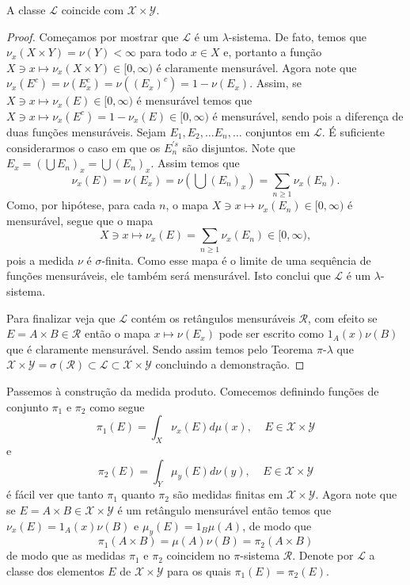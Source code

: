 \begin{proposicao}\label{Mens. Prod}
A classe $\mathscr{L}$ coincide com $\mathscr{X}\times \mathscr{Y}$.
\end{proposicao}
\begin{proof}
Começamos por mostrar que $\mathscr{L}$ é um $\lambda$-sistema. De fato, temos que
$\nu_x(X\times Y)=\nu(Y) < \infty$ para todo $x\in X$ e, portanto
 a função $X\ni x\mapsto \nu_x(X\times Y)\in [0,\infty)$ é claramente mensurável.
  Agora note que $\nu_x(E^c)=\nu(E^c_x)=\nu((E_x)^c)=1-\nu(E_x).$
 Assim, se $X\ni x\mapsto \nu_x(E)\in [0, \infty)$  é mensurável temos que 
 $X\ni x\mapsto \nu_x(E^c)=1-\nu_x(E)\in [0, \infty)$ é mensurável, sendo pois 
 a diferença de duas funções mensuráveis.
  Sejam $E_1, E_2, \ldots E_n, \ldots$ conjuntos em $\mathscr{L}.$ É suficiente 
  considerarmos o caso em que os $E_n^{'s}$ são disjuntos.
  Note que $E_x=(\bigcup E_n)_x=\bigcup (E_n)_x$. Assim temos que 
  $$
  \nu_x(E)=\nu(E_x)=\nu(\bigcup (E_n)_x)=\sum_{n\geq 1}\nu_x(E_n).
  $$
  Como, por hipótese, para cada $n$, o mapa $X\ni x\mapsto \nu_x(E_n)\in [0,\infty)$ é mensurável, segue que 
  o mapa 
  $$
 X\ni x\mapsto \nu_x(E)=\sum_{n\geq 1}\nu_x(E_n)\in [0,\infty),
 $$ 
 pois a medida $\nu$ é $\sigma$-finita. Como esse mapa é o 
limite de uma sequência de funções mensuráveis, ele também será mensurável. Isto conclui que $\mathscr{L}$ é um $\lambda$-sistema.
 
 Para finalizar veja  que $\mathscr{L}$ contém os retângulos mensuráveis $\mathscr{R}$, com efeito se $E=A\times B\in \mathscr{R}$ então o mapa $x\mapsto \nu(E_x)$ pode ser escrito como $1_A(x)\nu(B)$ que é claramente mensurável. Sendo assim temos pelo Teorema $\pi$-$\lambda$ que $\mathscr{X}\times \mathscr{Y}= \sigma(\mathscr{R})\subset \mathscr{L}\subset \mathscr{X}\times \mathscr{Y}$ concluindo a demonstração.
\end{proof}
\medskip


Passemos à construção da medida produto. Comecemos definindo funções de conjunto $\pi_1$ e $\pi_2$ como segue
\begin{equation}\label{M.Prod. 1}
\pi_1(E)=\int_X \nu_x(E) d\mu(x),~~~~~E \in \mathscr{X}\times \mathscr{Y}
\end{equation}
e 
\begin{equation}\label{M. Prod. 2}
\pi_2(E)=\int_Y \mu_y(E)d\nu(y),~~~~~E \in \mathscr{X}\times \mathscr{Y}
\end{equation}
é fácil ver que tanto $\pi_1$ quanto $\pi_2$ são medidas finitas em $\mathscr{X}\times \mathscr{Y}$. Agora note que se $E=A\times B\in\mathscr{X}\times \mathscr{Y}$  é um retângulo mensurável então temos que  $\nu_x(E)=1_A(x)\nu(B)$ e $\mu_y(E)=1_B\mu(A)$, de modo que 
\begin{equation}
\pi_1(A\times B)=\mu(A)\nu(B)=\pi_2(A\times B)
\end{equation}
de modo que as medidas $\pi_1$ e $\pi_2$ coincidem no $\pi$-sistema $\mathscr{R}$.  Denote por $\mathscr{L}$ a classe dos elementos $E$ de 
$\mathscr{X}\times \mathscr{Y}$  para os quais $\pi_1(E)=\pi_2(E)$.

